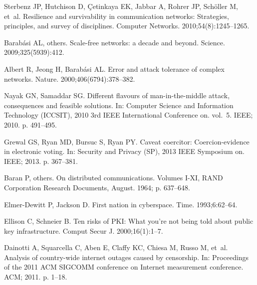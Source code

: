 \documentclass[10pt,letterpaper]{article}
\begin{document}
%
%
% 
\begin{thebibliography}{10}

Sterbenz JP, Hutchison D, Çetinkaya EK, Jabbar A, Rohrer JP, Schöller M,
  et~al.
\newblock Resilience and survivability in communication networks: {Strategies},
  principles, and survey of disciplines.
\newblock Computer Networks. 2010;54(8):1245--1265.

Barabási AL, {others}.
\newblock Scale-free networks: a decade and beyond.
\newblock Science. 2009;325(5939):412.

Albert R, Jeong H, Barabási AL.
\newblock Error and attack tolerance of complex networks.
\newblock Nature. 2000;406(6794):378--382.

Nayak GN, Samaddar SG.
\newblock Different flavours of man-in-the-middle attack, consequences and
  feasible solutions.
\newblock In: Computer {Science} and {Information} {Technology} ({ICCSIT}),
  2010 3rd {IEEE} {International} {Conference} on. vol.~5. IEEE; 2010. p.
  491--495.

Grewal GS, Ryan MD, Bursuc S, Ryan PY.
\newblock Caveat coercitor: {Coercion}-evidence in electronic voting.
\newblock In: Security and {Privacy} ({SP}), 2013 {IEEE} {Symposium} on. IEEE;
  2013. p. 367--381.

Baran P, {others}.
\newblock On distributed communications.
\newblock Volumes I-XI, RAND Corporation Research Documents, August. 1964; p.
  637--648.

Elmer-Dewitt P, Jackson D.
\newblock First nation in cyberspace.
\newblock Time. 1993;6:62--64.

Ellison C, Schneier B.
\newblock Ten risks of {PKI}: {What} you're not being told about public key
  infrastructure.
\newblock Comput Secur J. 2000;16(1):1--7.

Dainotti A, Squarcella C, Aben E, Claffy KC, Chiesa M, Russo M, et~al.
\newblock Analysis of country-wide internet outages caused by censorship.
\newblock In: Proceedings of the 2011 {ACM} {SIGCOMM} conference on {Internet}
  measurement conference. ACM; 2011. p. 1--18.


\end{thebibliography}
\end{document}
